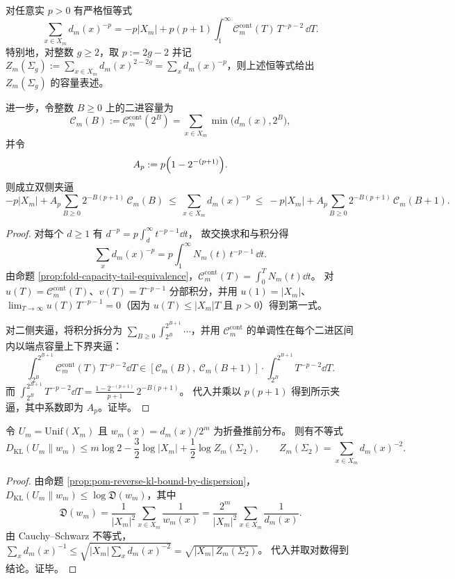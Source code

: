 \begin{proposition}[负阶幂和的容量表示与二进夹逼]\label{prop:fold-negative-moments-capacity-mellin}
对任意实 \(p>0\) 有严格恒等式
\[
\sum_{x\in X_m} d_m(x)^{-p}
=
-p|X_m|+p(p+1)\int_{1}^{\infty}\mathcal{C}_m^{\mathrm{cont}}(T)\,T^{-p-2}\,\dd T.
\]
特别地，对整数 \(g\ge 2\)，取 \(p:=2g-2\) 并记
\(
Z_m(\Sigma_g):=\sum_{x\in X_m}d_m(x)^{2-2g}=\sum_x d_m(x)^{-p}
\)，则上述恒等式给出 \(Z_m(\Sigma_g)\) 的容量表述。
\par
进一步，令整数 \(B\ge 0\) 上的二进容量为
\[
\mathcal{C}_m(B):=\mathcal{C}_m^{\mathrm{cont}}(2^B)=\sum_{x\in X_m}\min\bigl(d_m(x),2^B\bigr),
\]
并令
\[
A_p:=p\Bigl(1-2^{-(p+1)}\Bigr).
\]
则成立双侧夹逼
\[
-p|X_m|+A_p\sum_{B\ge 0}2^{-B(p+1)}\,\mathcal{C}_m(B)
\ \le\
\sum_{x\in X_m} d_m(x)^{-p}
\ \le\
-p|X_m|+A_p\sum_{B\ge 0}2^{-B(p+1)}\,\mathcal{C}_m(B+1).
\]
\end{proposition}
\begin{proof}
对每个 \(d\ge 1\) 有
\(
d^{-p}=p\int_{d}^{\infty}t^{-p-1}\dd t
\)，
故交换求和与积分得
\[
\sum_x d_m(x)^{-p}
=p\int_{1}^{\infty}N_m(t)\,t^{-p-1}\,\dd t.
\]
由命题 \ref{prop:fold-capacity-tail-equivalence}，\(\mathcal{C}_m^{\mathrm{cont}}(T)=\int_{0}^{T}N_m(t)\dd t\)。
对 \(u(T)=\mathcal{C}_m^{\mathrm{cont}}(T)\)、\(v(T)=T^{-p-1}\) 分部积分，并用 \(u(1)=|X_m|\)、\(\lim_{T\to\infty}u(T)\,T^{-p-1}=0\)（因为 \(u(T)\le |X_m|T\) 且 \(p>0\)）得到第一式。
\par
对二侧夹逼，将积分拆分为 \(\sum_{B\ge 0}\int_{2^B}^{2^{B+1}}\cdots\)，并用 \(\mathcal{C}_m^{\mathrm{cont}}\) 的单调性在每个二进区间内以端点容量上下界夹逼：
\[
\int_{2^B}^{2^{B+1}}\mathcal{C}_m^{\mathrm{cont}}(T)\,T^{-p-2}\dd T
\in
\left[\mathcal{C}_m(B),\ \mathcal{C}_m(B+1)\right]\cdot \int_{2^B}^{2^{B+1}}T^{-p-2}\dd T.
\]
而
\(
\int_{2^B}^{2^{B+1}}T^{-p-2}\dd T
=\frac{1-2^{-(p+1)}}{p+1}\,2^{-B(p+1)}
\)。
代入并乘以 \(p(p+1)\) 得到所示夹逼，其中系数即为 \(A_p\)。证毕。
\end{proof}

\begin{corollary}[属二配分函数控制的反向 KL 上界]\label{cor:fold-reversekl-controlled-by-genus2-partition}
令 \(U_m=\mathrm{Unif}(X_m)\) 且 \(w_m(x)=d_m(x)/2^m\) 为折叠推前分布。
则有不等式
\[
D_{\mathrm{KL}}(U_m\|w_m)
\le
m\log 2-\frac{3}{2}\log|X_m|+\frac{1}{2}\log Z_m(\Sigma_2),
\qquad
Z_m(\Sigma_2)=\sum_{x\in X_m}d_m(x)^{-2}.
\]
\end{corollary}
\begin{proof}
由命题 \ref{prop:pom-reverse-kl-bound-by-dispersion}，
\(
D_{\mathrm{KL}}(U_m\|w_m)\le \log\mathfrak{D}(w_m)
\)，其中
\[
\mathfrak{D}(w_m)=\frac{1}{|X_m|^2}\sum_{x\in X_m}\frac{1}{w_m(x)}
=\frac{2^m}{|X_m|^2}\sum_{x\in X_m}\frac{1}{d_m(x)}.
\]
由 Cauchy--Schwarz 不等式，
\(
\sum_x d_m(x)^{-1}\le \sqrt{|X_m|\sum_x d_m(x)^{-2}}=\sqrt{|X_m|\,Z_m(\Sigma_2)}
\)。
代入并取对数得到结论。证毕。
\end{proof}

\endinput
